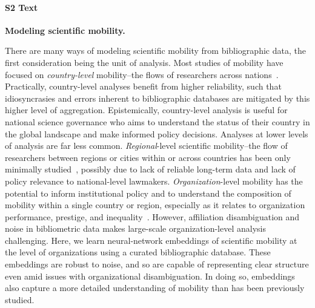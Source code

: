 \documentclass[12pt]{article} %
\begin{document}
%
\paragraph*{S2 Text}
\label{si:text:mobility_models}
{\bf Modeling scientific mobility.}

There are many ways of modeling scientific mobility from bibliographic data, the first consideration being the unit of analysis.
Most studies of mobility have focused on \textit{country-level} mobility--the flows of researchers across nations~\autocite{sugimoto2017mostimpact, scellato2015migrant, robinson-garcia2018indicators, franzoni2012foreign-born}.
Practically, country-level analyses benefit from higher reliability, such that idiosyncrasies and errors inherent to bibliographic databases are mitigated by this higher level of aggregation.
Epistemically, country-level analysis is useful for national science governance who aims to understand the status of their country in the global landscape and make informed policy decisions.
Analyses at lower levels of analysis are far less common.
\textit{Regional}-level scientific mobility--the flow of researchers between regions or cities within or across countries has been only minimally studied~\autocite{vaccario2019mobility}, possibly due to lack of reliable long-term data and lack of policy relevance to national-level lawmakers.
\textit{Organization}-level mobility has the potential to inform institutional policy and to understand the composition of mobility within a single country or region, especially as it relates to organization performance, prestige, and inequality~\autocite{albarran2017topeconomic, deville2014career, morgan2018prestige, clauset2015hierarchy}.
However, affiliation disambiguation and noise in bibliometric data makes large-scale organization-level analysis challenging.
Here, we learn neural-network embeddings of scientific mobility at the level of organizations using a curated bibliographic database.
These embeddings are robust to noise, and so are capable of representing clear structure even amid issues with organizational disambiguation.
In doing so, embeddings also capture a more detailed understanding of mobility than has been previously studied.
\end{document}
